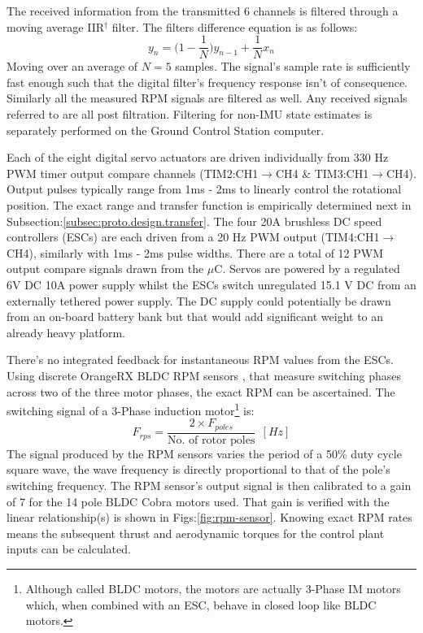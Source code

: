 \par
{\color{red}
The received information from the transmitted 6 channels is filtered through a moving average IIR$^\dagger$ filter. The filters difference equation is as follows: 
\begin{equation}
y_n = \big(1-\frac{1}{N}\big)y_{n-1}+\frac{1}{N}x_n
\end{equation}
Moving over an average of $N=5$ samples. The signal's sample rate is sufficiently fast enough such that the digital filter's frequency response isn't of consequence. Similarly all the measured RPM signals are filtered as well. Any received signals referred to are all post filtration. Filtering for non-IMU state estimates is separately performed on the Ground Control Station computer.}
\par
Each of the eight digital servo actuators are driven individually from 330 Hz PWM timer output compare channels (TIM2:CH1$\rightarrow$CH4 \& TIM3:CH1$\rightarrow$CH4). Output pulses typically range from 1ms - 2ms to linearly control the rotational position. The exact range and transfer function is empirically determined next in Subsection:\ref{subsec:proto.design.transfer}. The four 20A brushless DC speed controllers (ESCs) are each driven from a 20 Hz PWM output (TIM4:CH1$\rightarrow$CH4), similarly with 1ms - 2ms pulse widths. There are a total of 12 PWM output compare signals drawn from the $\mu$C. Servos are powered by a regulated 6V DC 10A power supply \cite{rotorstar} whilst the ESCs switch unregulated 15.1 V DC from an externally tethered power supply. The DC supply could potentially be drawn from an on-board battery bank but that would add significant weight to an already heavy platform.
\par
There's no integrated feedback for instantaneous RPM values from the ESCs. Using discrete OrangeRX BLDC RPM sensors \cite{orangerpm}, that measure switching phases across two of the three motor phases, the exact RPM can be ascertained. The switching signal of a 3-Phase induction motor\footnote{Although called BLDC motors, the motors are actually 3-Phase IM motors which, when combined with an ESC, behave in closed loop like BLDC motors.} is\cite{vfd}:
\begin{equation}
F_{rps}=\frac{2\times F_{poles}}{\text{No. of rotor poles}}~~[Hz]
\end{equation}
The signal produced by the RPM sensors varies the period of a 50\% duty cycle square wave, the wave frequency is directly proportional to that of the pole's switching frequency. The RPM sensor's output signal is then calibrated to a gain of 7 for the 14 pole BLDC Cobra motors used. That gain is verified with the linear relationship(s) is shown in Figs:\ref{fig:rpm-sensor}. Knowing exact RPM rates means the subsequent thrust and aerodynamic torques for the control plant inputs can be calculated.
